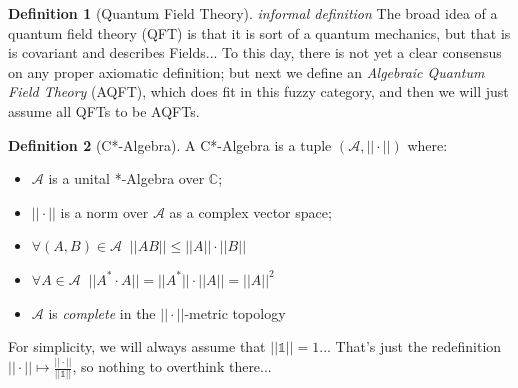 \documentclass[a4paper,11pt]{article}
\numberwithin{equation}{section}
\theoremstyle{definition}
\newtheorem{definition}{Definition}
\newtheorem{comment}{Comment}
\begin{document}
\begin{definition}[Quantum Field Theory] \emph{informal definition}
    The broad idea of a quantum field theory (QFT) is that it is sort of a quantum mechanics, but that is is covariant and describes Fields...
    To this day, there is not yet a clear consensus on any proper axiomatic definition; but next we define an \emph{Algebraic Quantum Field Theory} (AQFT), which does fit in this fuzzy category, and then we will just assume all QFTs to be AQFTs.
\end{definition}
\begin{definition}[C*-Algebra]
    A C*-Algebra is a tuple $(\mathcal{A}, ||\cdot||)$ where:
    \begin{itemize}
        \item $\mathcal{A}$ is a unital *-Algebra over $\mathbb{C}$;
        \item $||\cdot||$ is a norm over $\mathcal{A}$ as a complex vector space;
        \item $\forall (A,B)\in\mathcal{A}\;\; ||AB||\leq||A||\cdot||B||$
        \item $\forall A\in\mathcal{A}\;\; ||A^*\cdot A||=||A^*||\cdot||A||=||A||^2$
        \item $\mathcal{A}$ is \emph{complete} in the $||\cdot||$-metric topology
    \end{itemize} 
For simplicity, we will always assume that $||\mathds{1}||=1$... That's just the redefinition $||\cdot||\mapsto\frac{||\cdot||}{||\mathds{1}||}$, so nothing to overthink there...
\end{definition}

\end{document}
